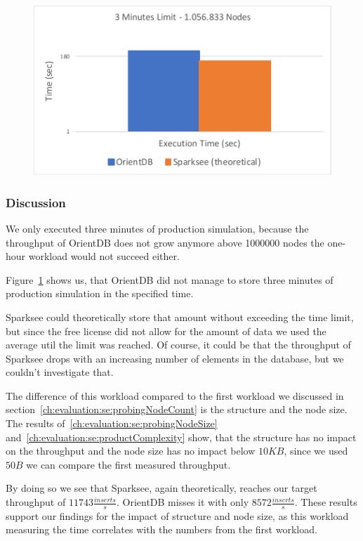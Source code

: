 \begin{figure}[h!]
  \centering
  \includegraphics[width=.75\textwidth]{images/production/singleSuitability}
  \label{fig:singleSuitability}
\end{figure}

\subsubsection{Discussion}
\label{ch:evaluation:se:suitabilityDiscussion}
We only executed three minutes of production simulation,
because the throughput of OrientDB does not grow anymore above 1000000 nodes the one-hour workload would not succeed either.

Figure~\ref{fig:singleSuitability} shows us,
that OrientDB did not manage to store three minutes of production simulation in the specified time.

Sparksee could theoretically store that amount without exceeding the time limit,
but since the free license did not allow for the amount of data we used the average util the limit was reached.
Of course,
it could be that the throughput of Sparksee drops with an increasing number of elements in the database,
but we couldn't investigate that.

The difference of this workload compared to the first workload we discussed in section~\ref{ch:evaluation:se:probingNodeCount} is the structure and the node size.
The results of~\ref{ch:evaluation:se:probingNodeSize} and~\ref{ch:evaluation:se:productComplexity} show,
that the structure has no impact on the throughput and the node size has no impact below $ 10KB $,
since we used $ 50B $ we can compare the first measured throughput.

By doing so we see that Sparksee,
again theoretically,
reaches our target throughput of $ 11743 \frac{inserts}{s} $.
OrientDB misses it with only $ 8572 \frac{inserts}{s} $.
These results support our findings for the impact of structure and node size,
as this workload measuring the time correlates with the numbers from the first workload.

